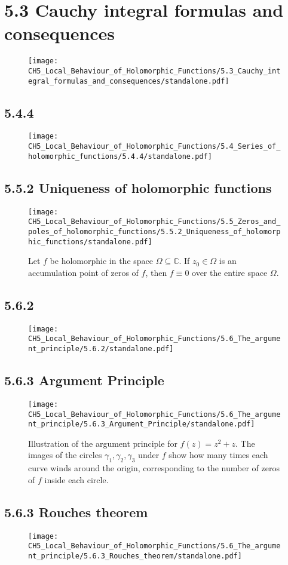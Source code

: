 \documentclass{book}
\begin{document}
\section*{5.3 Cauchy integral formulas and consequences}
\begin{figure}[H]
\centering
\texttt{[image: CH5\_Local\_Behaviour\_of\_Holomorphic\_Functions/5.3\_Cauchy\_integral\_formulas\_and\_consequences/standalone.pdf]}
\caption{}
\end{figure}

\subsection*{5.4.4}
\begin{figure}[H]
\centering
\texttt{[image: CH5\_Local\_Behaviour\_of\_Holomorphic\_Functions/5.4\_Series\_of\_holomorphic\_functions/5.4.4/standalone.pdf]}
\caption{}
\end{figure}

\subsection*{5.5.2 Uniqueness of holomorphic functions}
\begin{figure}[H]
\centering
\texttt{[image: CH5\_Local\_Behaviour\_of\_Holomorphic\_Functions/5.5\_Zeros\_and\_poles\_of\_holomorphic\_functions/5.5.2\_Uniqueness\_of\_holomorphic\_functions/standalone.pdf]}
\caption{Let $f$ be holomorphic in the space $\Omega \subseteq \mathbb{C}$. If $z_0 \in \Omega$ is an accumulation point of zeros of $f$, then $f\equiv 0$ over the entire space $\Omega$. }
\end{figure}

\subsection*{5.6.2}
\begin{figure}[H]
\centering
\texttt{[image: CH5\_Local\_Behaviour\_of\_Holomorphic\_Functions/5.6\_The\_argument\_principle/5.6.2/standalone.pdf]}
\caption{}
\end{figure}

\subsection*{5.6.3 Argument Principle}
\begin{figure}[H]
\centering
\texttt{[image: CH5\_Local\_Behaviour\_of\_Holomorphic\_Functions/5.6\_The\_argument\_principle/5.6.3\_Argument\_Principle/standalone.pdf]}
\caption{Illustration of the argument principle for \( f(z) = z^2 + z \). The images of the circles \( \gamma_1, \gamma_2, \gamma_3 \) under \( f \) show how many times each curve winds around the origin, corresponding to the number of zeros of \( f \) inside each circle.}
\end{figure}

\subsection*{5.6.3 Rouches theorem}
\begin{figure}[H]
\centering
\texttt{[image: CH5\_Local\_Behaviour\_of\_Holomorphic\_Functions/5.6\_The\_argument\_principle/5.6.3\_Rouches\_theorem/standalone.pdf]}
\caption{}
\end{figure}
\end{document}
